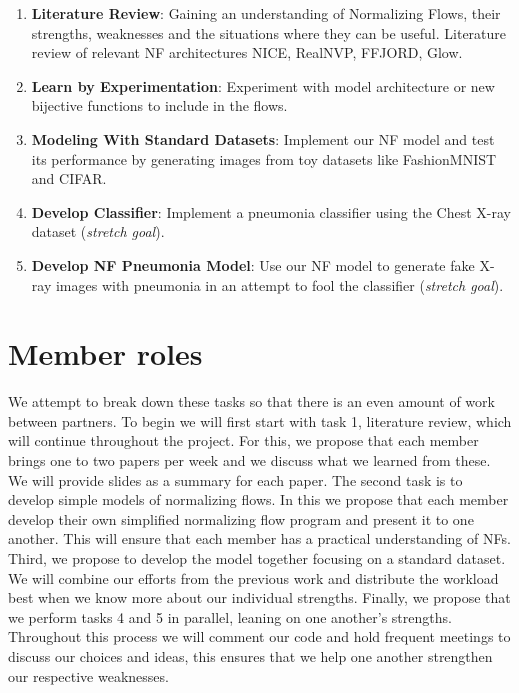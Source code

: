 \documentclass{article}
\begin{document}
\begin{enumerate} 
	\item \textbf{Literature Review}: Gaining an understanding of
		Normalizing Flows, their strengths, weaknesses and the
		situations where they can be useful. Literature review of
		relevant NF architectures NICE\cite{nice},
		RealNVP\cite{real_nvp}, FFJORD\cite{ffjord}, Glow\cite{glow}.  
	\item \textbf{Learn by Experimentation}: Experiment with model
		architecture or new bijective functions to include in the
		flows.  
	\item \textbf{Modeling With Standard Datasets}: Implement our NF model
		and test its performance by generating images from toy datasets
		like FashionMNIST and CIFAR.  
	\item \textbf{Develop Classifier}: Implement a pneumonia classifier
		using the Chest X-ray dataset (\textit{stretch goal}).  
	\item \textbf{Develop NF Pneumonia Model}: Use our NF model to generate
		fake X-ray images with pneumonia in an attempt to fool the
		classifier (\textit{stretch goal}).  \end{enumerate}

\section{Member roles} 
We attempt to break down these tasks so that there is an
even amount of work between partners. To begin we will first start with task 1,
literature review, which will continue throughout the project. For this, we
propose that each member brings one to two papers per week and we discuss what
we learned from these. We will provide slides as a summary for each paper. The
second task is to develop simple models of normalizing flows. In this we
propose that each member develop their own simplified normalizing flow program
and present it to one another. This will ensure that each member has a
practical understanding of NFs. Third, we propose to develop the model together
focusing on a standard dataset. We will combine our efforts from the previous
work and distribute the workload best when we know more about our individual
strengths. Finally, we propose that we perform tasks 4 and 5 in parallel,
leaning on one another's strengths. Throughout this process we will comment our
code and hold frequent meetings to discuss our choices and ideas, this ensures
that we help one another strengthen our respective weaknesses. 
\end{document}
